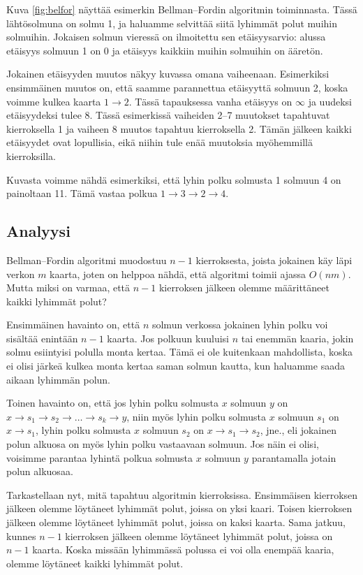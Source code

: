 Kuva \ref{fig:belfor} näyttää esimerkin Bellman–Fordin algoritmin toiminnasta.
Tässä lähtösolmuna on solmu 1, ja haluamme selvittää siitä
lyhimmät polut muihin solmuihin.
Jokaisen solmun vieressä on ilmoitettu sen etäisyysarvio:
alussa etäisyys solmuun 1 on 0 ja etäisyys kaikkiin muihin solmuihin on ääretön.

Jokainen etäisyyden muutos näkyy kuvassa omana vaiheenaan.
Esimerkiksi ensimmäinen muutos on,
että saamme parannettua etäisyyttä solmuun 2,
koska voimme kulkea kaarta $1 \rightarrow 2$.
Tässä tapauksessa vanha etäisyys on $\infty$ ja uudeksi
etäisyydeksi tulee $8$.
Tässä esimerkissä vaiheiden 2--7 muutokset tapahtuvat
kierroksella 1 ja vaiheen 8 muutos tapahtuu kierroksella 2.
Tämän jälkeen kaikki etäisyydet ovat lopullisia,
eikä niihin tule enää muutoksia myöhemmillä kierroksilla.

Kuvasta voimme nähdä esimerkiksi,
että lyhin polku solmusta 1 solmuun 4 on painoltaan 11.
Tämä vastaa polkua $1 \rightarrow 3 \rightarrow 2 \rightarrow 4$.

\subsection{Analyysi}

Bellman–Fordin algoritmi muodostuu $n-1$ kierroksesta,
joista jokainen käy läpi verkon $m$ kaarta,
joten on helppoa nähdä, että algoritmi toimii ajassa $O(nm)$.
Mutta miksi on varmaa, että $n-1$ kierroksen jälkeen olemme
määrittäneet kaikki lyhimmät polut?

Ensimmäinen havainto on,
että $n$ solmun verkossa jokainen lyhin polku voi
sisältää enintään $n-1$ kaarta.
Jos polkuun kuuluisi $n$ tai enemmän kaaria,
jokin solmu esiintyisi polulla monta kertaa.
Tämä ei ole kuitenkaan mahdollista,
koska ei olisi järkeä kulkea monta kertaa saman solmun kautta,
kun haluamme saada aikaan lyhimmän polun.

Toinen havainto on, että jos lyhin polku solmusta $x$ solmuun $y$ on
$x \rightarrow s_1 \rightarrow s_2 \rightarrow \dots \rightarrow s_k \rightarrow y$,
niin myös lyhin polku solmusta $x$ solmuun $s_1$ on $x \rightarrow s_1$,
lyhin polku solmusta $x$ solmuun $s_2$ on $x \rightarrow s_1 \rightarrow s_2$, jne.,
eli jokainen polun alkuosa on myös lyhin polku vastaavaan solmuun.
Jos näin ei olisi, voisimme parantaa lyhintä polkua solmusta $x$ solmuun $y$
parantamalla jotain polun alkuosaa.

Tarkastellaan nyt, mitä tapahtuu algoritmin kierroksissa.
Ensimmäisen kierroksen jälkeen olemme löytäneet lyhimmät polut,
joissa on yksi kaari.
Toisen kierroksen jälkeen olemme löytäneet lyhimmät polut,
joissa on kaksi kaarta.
Sama jatkuu, kunnes $n-1$ kierroksen jälkeen olemme löytäneet
lyhimmät polut, joissa on $n-1$ kaarta.
Koska missään lyhimmässä polussa ei voi olla enempää kaaria,
olemme löytäneet kaikki lyhimmät polut.

